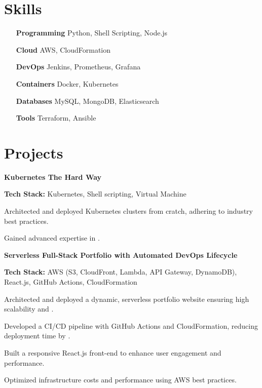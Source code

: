 \documentclass[letterpaper,10pt]{article}
\newcommand{\heading}[2]{
  \hspace{10pt}#1\hfill#2\\
}
\newcommand{\headingBf}[2]{
  \heading{\textbf{#1}}{\textbf{#2}}
}
\newenvironment{resume_list}{
  \vspace{-7pt}
  \begin{itemize}[itemsep=-2px, parsep=1pt, leftmargin=30pt]
}{
  \end{itemize}
}
\begin{document}
\section{Skills}
\begin{multicols}{2}
  \begin{itemize}[itemsep=-2px, parsep=1pt, leftmargin=75pt]
    \item[\textbf{Programming}] Python, Shell Scripting, Node.js
    \item[\textbf{Cloud}] AWS, CloudFormation
    \item[\textbf{DevOps}] Jenkins, Prometheus, Grafana
    \item[\textbf{Containers}] Docker, Kubernetes
    \item[\textbf{Databases}] MySQL, MongoDB, Elasticsearch
    \item[\textbf{Tools}] Terraform, Ansible
  \end{itemize}
\end{multicols}

\section{Projects}

\headingBf{Kubernetes The Hard Way \href{https://github.com/1md3nd/kubernetes}{\small\textit{\color{gray}{Link}}}}{}
\begin{resume_list}
  \item \textbf{Tech Stack:} Kubernetes, Shell scripting, Virtual Machine 
  \item Architected and deployed Kubernetes clusters from cratch, adhering to industry best practices.
  \item Gained advanced expertise in \textbf{\color{accentTitle}{cluster management, scaling, and security configurations}}.
\end{resume_list}

\headingBf{Serverless Full-Stack Portfolio with Automated DevOps Lifecycle \href{https://github.com/1md3nd/portfolio}{\small\textit{\color{gray}{Link}}}}{}
\begin{resume_list}
  \item \textbf{Tech Stack:} AWS (S3, CloudFront, Lambda, API Gateway, DynamoDB), React.js, GitHub Actions, CloudFormation 
  \item Architected and deployed a dynamic, serverless portfolio website ensuring high scalability and \textbf{\color{accentTitle}{99.99\% uptime}}.
  \item Developed a CI/CD pipeline with GitHub Actions and CloudFormation, reducing deployment time by \textbf{\color{accentTitle}{50\%}}.
  \item Built a responsive React.js front-end to enhance user engagement and performance.
  \item Optimized infrastructure costs and performance using AWS best practices.
\end{resume_list}
\end{document}
